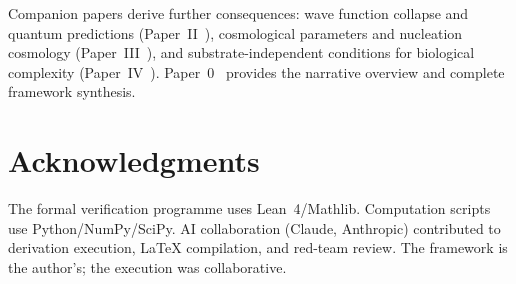 \documentclass[12pt,a4paper]{article}
\begin{document}
Companion papers derive further consequences: wave function collapse and quantum predictions (Paper~II~\cite{P2}), cosmological parameters and nucleation cosmology (Paper~III~\cite{P3}), and substrate-independent conditions for biological complexity (Paper~IV~\cite{P4}). Paper~0~\cite{P0} provides the narrative overview and complete framework synthesis.

\section*{Acknowledgments}

The formal verification programme uses Lean~4/Mathlib. Computation scripts use Python/NumPy/SciPy. AI collaboration (Claude, Anthropic) contributed to derivation execution, LaTeX compilation, and red-team review. The framework is the author's; the execution was collaborative.
\end{document}
